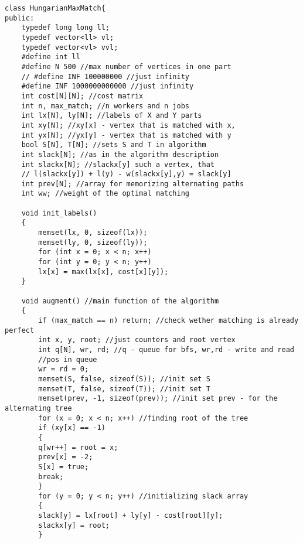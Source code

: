 \documentclass[a4paper,landscape,8pt]{extarticle}
\begin{document}
\begin{multicols}{3}
\begin{lstlisting}
class HungarianMaxMatch{
public:
    typedef long long ll;
    typedef vector<ll> vl;
    typedef vector<vl> vvl;
    #define int ll
    #define N 500 //max number of vertices in one part
    // #define INF 100000000 //just infinity
    #define INF 1000000000000 //just infinity
    int cost[N][N]; //cost matrix
    int n, max_match; //n workers and n jobs
    int lx[N], ly[N]; //labels of X and Y parts
    int xy[N]; //xy[x] - vertex that is matched with x,
    int yx[N]; //yx[y] - vertex that is matched with y
    bool S[N], T[N]; //sets S and T in algorithm
    int slack[N]; //as in the algorithm description
    int slackx[N]; //slackx[y] such a vertex, that
    // l(slackx[y]) + l(y) - w(slackx[y],y) = slack[y]
    int prev[N]; //array for memorizing alternating paths
    int ww; //weight of the optimal matching

    void init_labels()
    {
        memset(lx, 0, sizeof(lx));
        memset(ly, 0, sizeof(ly));
        for (int x = 0; x < n; x++)
        for (int y = 0; y < n; y++)
        lx[x] = max(lx[x], cost[x][y]);
    }

    void augment() //main function of the algorithm
    {
        if (max_match == n) return; //check wether matching is already perfect
        int x, y, root; //just counters and root vertex
        int q[N], wr, rd; //q - queue for bfs, wr,rd - write and read
        //pos in queue
        wr = rd = 0;
        memset(S, false, sizeof(S)); //init set S
        memset(T, false, sizeof(T)); //init set T
        memset(prev, -1, sizeof(prev)); //init set prev - for the alternating tree
        for (x = 0; x < n; x++) //finding root of the tree
        if (xy[x] == -1)
        {
        q[wr++] = root = x;
        prev[x] = -2;
        S[x] = true;
        break;
        }
        for (y = 0; y < n; y++) //initializing slack array
        {
        slack[y] = lx[root] + ly[y] - cost[root][y];
        slackx[y] = root;
        }


\end{lstlisting}
\end{multicols}
\end{document}
